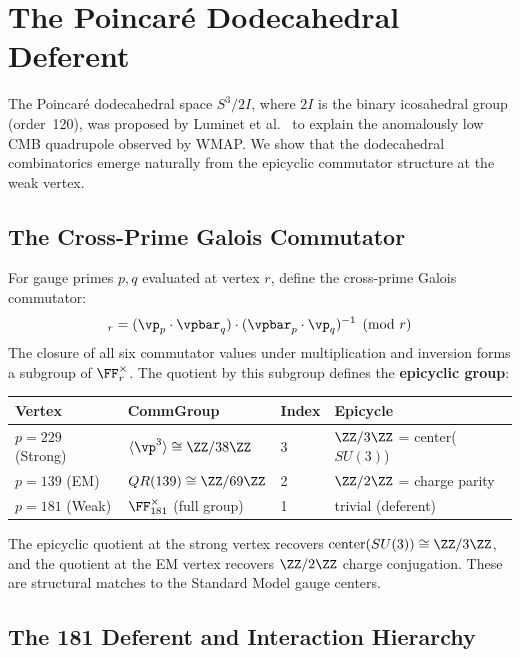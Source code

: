 \section{The Poincar\'{e} Dodecahedral Deferent}

The Poincar\'{e} dodecahedral space $S^3 / 2I$, where $2I$ is the binary icosahedral group (order~120), was proposed by Luminet et al.~\cite{luminet2003} to explain the anomalously low CMB quadrupole observed by WMAP. We show that the dodecahedral combinatorics emerge naturally from the epicyclic commutator structure at the weak vertex.

\subsection{The Cross-Prime Galois Commutator}

For gauge primes $p, q$ evaluated at vertex $r$, define the cross-prime Galois commutator:
\begin{equation}
    [p,q]_r = (\vp_p \cdot \vpbar_q) \cdot (\vpbar_p \cdot \vp_q)^{-1} \pmod{r}
\end{equation}
The closure of all six commutator values under multiplication and inversion forms a subgroup of $\FF_r^{\times}$. The quotient by this subgroup defines the \textbf{epicyclic group}:

\begin{center}
\begin{tabular}{llll}
\hline
Vertex & CommGroup & Index & Epicycle \\
\hline
$p=229$ (Strong) & $\langle \vp^3 \rangle \cong \ZZ/38\ZZ$ & 3 & $\ZZ/3\ZZ$ = center($SU(3)$) \\
$p=139$ (EM) & $QR(139) \cong \ZZ/69\ZZ$ & 2 & $\ZZ/2\ZZ$ = charge parity \\
$p=181$ (Weak) & $\FF_{181}^{\times}$ (full group) & 1 & trivial (deferent) \\
\hline
\end{tabular}
\end{center}

The epicyclic quotient at the strong vertex recovers $\operatorname{center}(SU(3)) \cong \ZZ/3\ZZ$, and the quotient at the EM vertex recovers $\ZZ/2\ZZ$ charge conjugation. These are structural matches to the Standard Model gauge centers.

\subsection{The 181 Deferent and Interaction Hierarchy}

